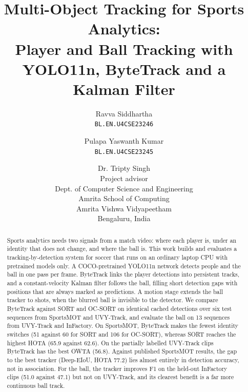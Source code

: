 \documentclass[11pt,a4paper]{article}
\begin{document}
\title{Multi-Object Tracking for Sports Analytics:\\[0.3em] Player and Ball Tracking with YOLO11n, ByteTrack and a Kalman Filter}

\author{Ravva Siddhartha \\ \small\texttt{BL.EN.U4CSE23246} \and Pulapa Yaswanth Kumar \\ \small\texttt{BL.EN.U4CSE23245} \and Dr. Tripty Singh \\ \small Project advisor \\[0.8em] \small Dept. of Computer Science and Engineering \\ Amrita School of Computing \\ Amrita Vishwa Vidyapeetham \\ Bengaluru, India}
\date{}

\maketitle


\begin{abstract}
Sports analytics needs two signals from a match video: where each player is,
under an identity that does not change, and where the ball is. This work builds
and evaluates a tracking-by-detection system for soccer that runs on an ordinary
laptop CPU with pretrained models only. A COCO-pretrained YOLO11n network
detects people and the ball in one pass per frame. ByteTrack links the player
detections into persistent tracks, and a constant-velocity Kalman filter follows
the ball, filling short detection gaps with positions that are always marked as
predictions. A motion stage extends the ball tracker to shots, when the blurred
ball is invisible to the detector. We compare ByteTrack against SORT and OC-SORT
on identical cached detections over six test sequences from SportsMOT and
UVY-Track, and evaluate the ball on 13 sequences from UVY-Track and
InFactory. On SportsMOT, ByteTrack makes the fewest identity switches
(51 against 60 for SORT and 106 for
OC-SORT), whereas SORT reaches the highest HOTA (65.9 against
62.6). On the partially labelled UVY-Track clips ByteTrack has the
best OWTA (56.8). Against published SportsMOT results, the gap to
the best tracker (Deep-EIoU, HOTA 77.2) lies almost entirely in
detection accuracy, not in association. For the ball, the tracker improves F1 on
the held-out InFactory clips (51.0 against 47.1) but
not on UVY-Track, and its clearest benefit is a far more continuous ball track.
\end{abstract}
\end{document}
